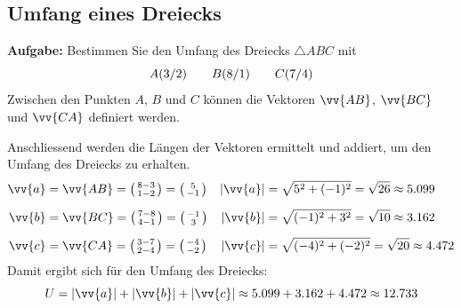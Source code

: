 \subsection{Umfang eines Dreiecks}
\textbf{Aufgabe:} Bestimmen Sie den Umfang des Dreiecks $\triangle ABC$ mit
\[
  \coord[A]{3,2} \qquad \coord[B]{8,1} \qquad \coord[C]{7,4}
\]
Zwischen den Punkten $A$, $B$ und $C$ können die Vektoren $\vv{AB}$, $\vv{BC}$ und $\vv{CA}$ definiert werden.
\begin{center}
\end{center}
Anschliessend werden die Längen der Vektoren ermittelt und addiert, um den Umfang des Dreiecks zu erhalten.
\begin{align*}
  \vv{a} &= \vv{AB} = \tvec{8-3,1-2} = \tvec{5,-1} & |\vv{a}| &= \sqrt{5^{2}+(-1)^{2}} = \sqrt{26} \approx 5.099 \\[2mm]
  \vv{b} &= \vv{BC} = \tvec{7-8,4-1} = \tvec{-1,3} & |\vv{b}| &= \sqrt{(-1)^{2}+3^{2}} = \sqrt{10} \approx 3.162 \\[2mm]
  \vv{c} &= \vv{CA} = \tvec{3-7,2-4} = \tvec{-4,-2} & |\vv{c}| &= \sqrt{(-4)^{2}+(-2)^{2}} = \sqrt{20} \approx 4.472
\end{align*}
Damit ergibt sich für den Umfang des Dreiecks:
\[
  U = |\vv{a}|+|\vv{b}|+|\vv{c}| \approx 5.099 + 3.162 + 4.472 \approx 12.733
\]

\newpage
